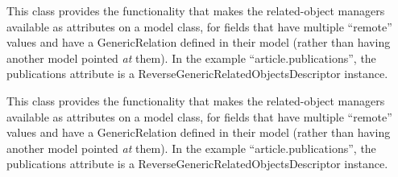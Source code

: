 \documentclass[letterpaper,10pt,english]{sphinxmanual}
\begin{document}
\begin{fulllineitems}
\begin{fulllineitems}
\end{fulllineitems}



\begin{fulllineitems}
\label{generated/apps.profiles.models:apps.profiles.models.Person.unit_permissions}
This class provides the functionality that makes the related-object
managers available as attributes on a model class, for fields that have
multiple ``remote'' values and have a GenericRelation defined in their model
(rather than having another model pointed \emph{at} them). In the example
``article.publications'', the publications attribute is a
ReverseGenericRelatedObjectsDescriptor instance.

\end{fulllineitems}



\begin{fulllineitems}
\label{generated/apps.profiles.models:apps.profiles.models.Person.user_perms_set}
This class provides the functionality that makes the related-object
managers available as attributes on a model class, for fields that have
multiple ``remote'' values and have a GenericRelation defined in their model
(rather than having another model pointed \emph{at} them). In the example
``article.publications'', the publications attribute is a
ReverseGenericRelatedObjectsDescriptor instance.

\end{fulllineitems}


\end{fulllineitems}


\end{document}
